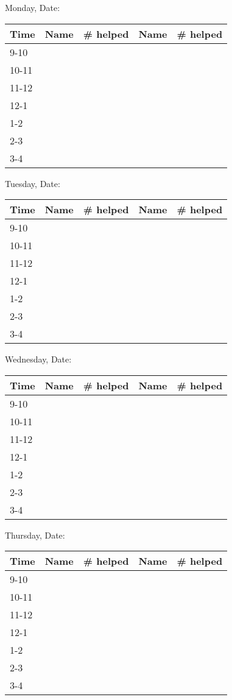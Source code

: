 \documentclass[10pt]{report}
\begin{document}
\pagestyle{empty}

\noindent
Monday, Date:
\\
\begin{tabular}{|l|p{4cm}|l|p{4cm}|l|}
  \hline  Time   &  Name &  \# helped  &  Name  &  \# helped
  \\  \hline  9-10 &&&&
  \\  \hline  10-11 &&&&
  \\  \hline  11-12 &&&&
  \\  \hline  12-1 &&&&
  \\  \hline  1-2 &&&&
  \\  \hline  2-3 &&&&
  \\  \hline  3-4 &&&&
  \\ \hline
\end{tabular}

\noindent
Tuesday, Date:
\\
\begin{tabular}{|l|p{4cm}|l|p{4cm}|l|}
  \hline  Time   &  Name &  \# helped  &  Name  &  \# helped
  \\  \hline  9-10 &&&&
  \\  \hline  10-11 &&&&
  \\  \hline  11-12 &&&&
  \\  \hline  12-1 &&&&
  \\  \hline  1-2 &&&&
  \\  \hline  2-3 &&&&
  \\  \hline  3-4 &&&&
  \\ \hline
\end{tabular}

\noindent
Wednesday, Date:
\\
\begin{tabular}{|l|p{4cm}|l|p{4cm}|l|}
  \hline  Time   &  Name &  \# helped  &  Name  &  \# helped
  \\  \hline  9-10 &&&&
  \\  \hline  10-11 &&&&
  \\  \hline  11-12 &&&&
  \\  \hline  12-1 &&&&
  \\  \hline  1-2 &&&&
  \\  \hline  2-3 &&&&
  \\  \hline  3-4 &&&&
  \\ \hline
\end{tabular}

\noindent
Thursday, Date:
\\
\begin{tabular}{|l|p{4cm}|l|p{4cm}|l|}
  \hline  Time   &  Name &  \# helped  &  Name  &  \# helped
  \\  \hline  9-10 &&&&
  \\  \hline  10-11 &&&&
  \\  \hline  11-12 &&&&
  \\  \hline  12-1 &&&&
  \\  \hline  1-2 &&&&
  \\  \hline  2-3 &&&&
  \\  \hline  3-4 &&&&
  \\ \hline
\end{tabular}
\end{document}
